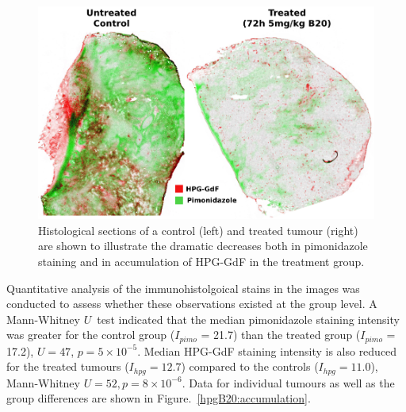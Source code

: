 \begin{figure}[htbp] %
  \centering
  \includegraphics[width=\textwidth]{hpg/hpg-B20-images/histo_hpgPimo.png} 
  \captionsetup{width=\linewidth}
  \caption{Histological sections of a control (left) and treated tumour (right) are shown to illustrate the dramatic decreases both in pimonidazole staining and in accumulation of \acs{HPG-GdF} in the treatment group.}
  \label{hpgB20:histohpgpimo}
\end{figure}

Quantitative analysis of the immunohistolgoical stains in the images was conducted to assess whether these observations existed at the group level. 
A Mann-Whitney $U$~test indicated that the median pimonidazole staining intensity was greater for the control group ($I_{pimo}$ = 21.7) than the treated group ($I_{pimo}$ = 17.2), $U = 47$, $p = 5\times10^{-5}$.
Median \acs{HPG-GdF} staining intensity is also reduced for the treated tumours ($I_{hpg} = 12.7$) compared to the controls ($I_{hpg} =11.0$), Mann-Whitney $U=52, p = 8\times10^{-6}$.
Data for individual tumours as well as the group differences are shown in Figure.~\ref{hpgB20:accumulation}.


